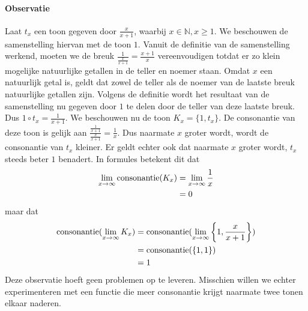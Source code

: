 \documentclass[a4paper]{article}
\begin{document}
\paragraph{Observatie}
Laat $t_x$ een toon gegeven door $\frac{x}{x+1}$, waarbij $x \in \mathbb{N}, x \geq 1 $.
We beschouwen de samenstelling hiervan met de toon $1$.
Vanuit de definitie van de samenstelling werkend, moeten we de breuk $\frac{1}{\frac{x}{x+1}} = \frac{x+1}{x}$ vereenvoudigen totdat er zo klein mogelijke natuurlijke getallen in de teller en noemer staan.
Omdat $x$ een natuurlijk getal is, geldt dat zowel de teller als de noemer van de laatste breuk natuurlijke getallen zijn.
Volgens de definitie wordt het resultaat van de samenstelling nu gegeven door $1$ te delen door de teller van deze laatste breuk.
Dus $1 \circ t_x = \frac{1}{x+1}$.
We beschouwen nu de toon $K_x = \{1,t_x\}$.
De consonantie van deze toon is gelijk aan $\frac{\frac{1}{x+1}}{\frac{x}{x+1}} = \frac{1}{x}$.
Dus naarmate $x$ groter wordt, wordt de consonantie van $t_x$ kleiner.
Er geldt echter ook dat naarmate $x$ groter wordt, $t_x$ steeds beter $1$ benadert.
In formules betekent dit dat
\begin{equation*}
	\begin{split}
		\lim_{x \to \infty}{\mathrm{consonantie}(K_x)} 	&= \lim_{x \to \infty}{\frac{1}{x}} \\
												&= 0
	\end{split}
\end{equation*}
maar dat
\begin{equation*}
	\begin{split}
		\mathrm{consonantie}(\lim_{x \to \infty}{K_x}) 	&= \mathrm{consonantie}(\lim_{x \to \infty}{\left\{ 1,\frac{x}{x+1} \right\}}) \\
												&= \mathrm{consonantie}(\left\{ 1,1 \right\}) \\
												&= 1
	\end{split}
\end{equation*}
Deze observatie hoeft geen problemen op te leveren.
Misschien willen we echter experimenteren met een functie die meer consonantie krijgt naarmate twee tonen elkaar naderen.
\end{document}
